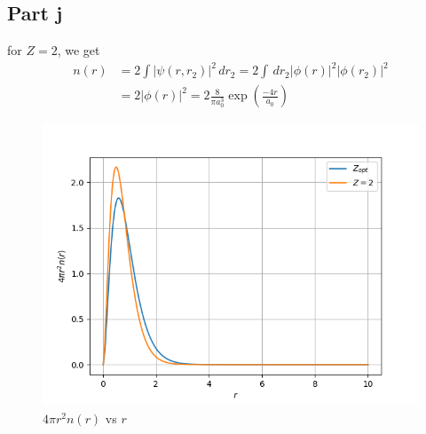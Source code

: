 \documentclass[12pt]{report}
\theoremstyle{custom}
\begin{document}
\subsection*{Part j}
for $Z = 2$, we get
\begin{align*}
    n(r) &= 2\int |\psi(r,r_2)|^2 \, dr_2 =2 \int \, dr_2 |\phi(r)|^2 |\phi(r_2)|^2 \\
    &=  2|\phi(r)|^2 =  2 \frac{8}{\pi a_0^3} \exp\left(\frac{-4r}{a_0}\right)
\end{align*}
\begin{figure}[H]
    \centering
    \includegraphics[scale=0.8
    ]{CSE_389D/ps_4/density(1).png}
    \caption{$4\pi r^2n(r)$ vs $r$
}
    \label{fig:enter-label}
\end{figure}


\end{document}
